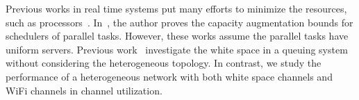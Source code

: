 Previous works in real time systems put many efforts to minimize the resources, such as processors~\cite{nelissen2012techniques}.
In~\cite{li2014analysis}, the author proves the capacity augmentation bounds for schedulers of parallel tasks. 
However, these works assume the parallel tasks have uniform servers. 
Previous work~\cite{chen2011feasibility} investigate the white space in a queuing system without considering the 
heterogeneous topology.
In contrast, we study the performance of a heterogeneous network with both white space channels 
and WiFi channels in channel utilization. 






